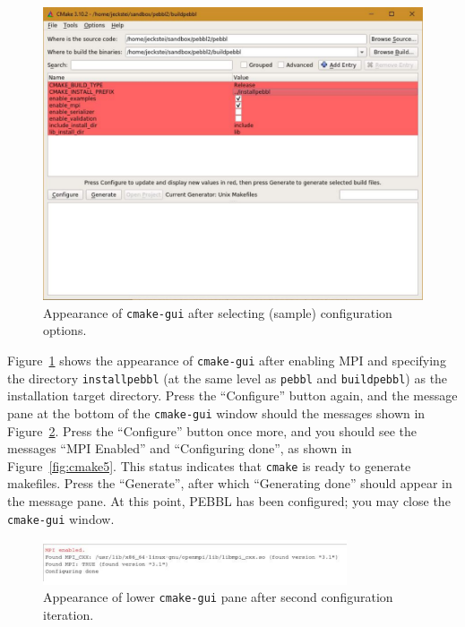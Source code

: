 \begin{figure}[tpb]
\begin{center}
\includegraphics[height=0.45\textheight]{cmake3}
\vspace{-0.3in}
\end{center}{}
\caption{Appearance of \texttt{cmake-gui} after selecting (sample)
configuration options.
  \label{fig:cmake3}}
\end{figure}

Figure~\ref{fig:cmake3} shows the appearance of \texttt{cmake-gui} after
enabling MPI and specifying the directory \texttt{installpebbl} (at the same level as
\texttt{pebbl} and \texttt{buildpebbl}) as the installation target directory.
Press the ``Configure'' button again, and the message pane at the bottom of
the \texttt{cmake-gui} window should the messages shown in
Figure~\ref{fig:cmake4}.  Press the ``Configure'' button once more, and you
should see the messages ``MPI Enabled'' and ``Configuring done'', as shown in
Figure~\ref{fig:cmake5}.  This status indicates that \texttt{cmake} is ready
to generate makefiles.  Press the ``Generate'', after which ``Generating
done'' should appear in the message pane.  At this point, PEBBL has been
configured; you may close the \texttt{cmake-gui} window.

\begin{figure}[tpb]
\begin{center}
\includegraphics[width=0.8\textwidth]{cmake4}
\vspace{-0.3in}
\end{center}{}
\caption{Appearance of lower \texttt{cmake-gui} pane after second
configuration iteration.
  \label{fig:cmake4}}
\end{figure}

